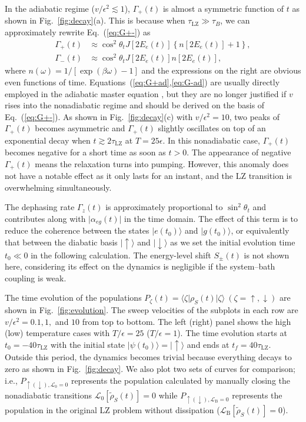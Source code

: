 \documentclass[english,nofootinbib, pra, twocolumn,superscriptaddress]{revtex4-1}
\begin{document}
In the adiabatic regime ($v/\epsilon^{2}\lesssim1$), $\Gamma_{+}(t)$
is almost a symmetric function of $t$ as shown in Fig.~\ref{fig:decay}(a).
This is because when $\tau_{\text{LZ}}\gg\tau_{B}$, we can approximately
rewrite Eq.~(\ref{eq:G+-}) as
\begin{align}
\Gamma_{+}(t) & \approx\cos^{2}\theta_{t}J\left[2E_{e}(t)\right]\left\{n\left[2E_{e}(t)\right]+1\right\},\label{eq:G+ad}\\
\Gamma_{-}(t) & \approx\cos^{2}\theta_{t}J\left[2E_{e}(t)\right]n\left[2E_{e}(t)\right],\label{eq:G-ad}
\end{align}
where $n(\omega)=1/[\exp(\beta\omega)-1]$ and the expressions on the
right are obvious even functions of time. Equations~(\ref{eq:G+ad},\ref{eq:G-ad})
are usually directly employed in the adiabatic master equation \citep{2014.liu,2018.Xu},
but they are no longer justified if $v$ rises into
the nonadiabatic regime and should be derived on the basis of Eq.~(\ref{eq:G+-}).
As shown in Fig.~\ref{fig:decay}(c) with $v/\epsilon^{2}=10$, two
peaks of $\Gamma_{+}(t)$ becomes asymmetric and $\Gamma_{+}(t)$ slightly
oscillates on top of an exponential decay when $t\apprge2\tau_{\text{LZ}}$
at $T=25\epsilon$. In this nonadiabatic case, $\Gamma_{+}(t)$
becomes negative for a short time as soon as $t>0$. The appearance
of negative $\Gamma_{+}(t)$ means the relaxation turns into pumping.
However, this anomaly does not have a notable effect as
it only lasts for an instant, and the LZ transition is overwhelming simultaneously.

The dephasing rate $\Gamma_{z}(t)$ is approximately proportional
to $\sin^{2}\theta_{t}$ and contributes along with $\vert\alpha_{eg}(t)\vert$
in the time domain. The effect of this term is to reduce the coherence
between the states $\vert e(t_{0})\rangle$ and $\vert g(t_{0})\rangle$,
or equivalently that between the diabatic basis $\vert\uparrow\rangle$ and
$\vert\downarrow\rangle$ as we set the initial evolution time $t_{0}\ll0$
in the following calculation. The energy-level shift $S_{\pm}(t)$
is not shown here, considering its effect on the dynamics is
negligible if the system--bath coupling is weak. 

The time evolution of the populations $P_{\zeta}(t)=\langle\zeta\vert\rho_{S}(t)\vert\zeta\rangle\ (\zeta=\uparrow,\downarrow)$
are shown in Fig.~\ref{fig:evolution}. The sweep velocities of the
subplots in each row are $v/\epsilon^{2}=0.1,1,$ and $10$ from top
to bottom. The left (right) panel shows the high (low)
temperature cases with $T/\epsilon=25$ ($T/\epsilon=1$). The time
evolution starts at $t_{0}=-40\tau_{\text{LZ}}$ with the initial
state $\vert\psi(t_{0})\rangle=\vert\uparrow\rangle$ and ends
at $t_{f}=40\tau_{\text{LZ}}$. Outside this period, the dynamics becomes
trivial because everything decays to zero as shown in Fig.~\ref{fig:decay}.
We also plot two sets of curves for comparison; i.e., $P_{\uparrow(\downarrow),\mathcal{L}_{\text{0}}=0}$
represents the population calculated by manually closing the nonadiabatic
transitions $\mathcal{L}_{\text{0}}[\tilde{\rho}_{S}(t)]=0$ while
$P_{\uparrow(\downarrow),\mathcal{L}_{\text{B}}=0}$ represents the population
in the original LZ problem without dissipation ($\mathcal{L}_{\text{B}}[\tilde{\rho}_{S}(t)]=0$).
\end{document}
